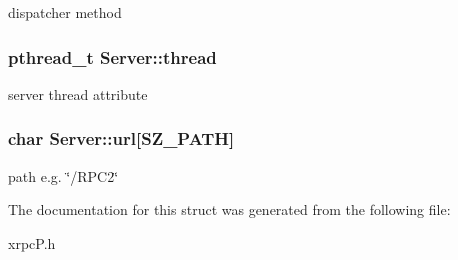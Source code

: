 dispatcher method \hypertarget{structServer_b30292985309c492e4ba0ebbf2a6934a}{
\subsubsection[{thread}]{\setlength{\rightskip}{0pt plus 5cm}pthread\_\-t {\bf Server::thread}}}
\label{structServer_b30292985309c492e4ba0ebbf2a6934a}


server thread attribute \hypertarget{structServer_732b4b0eb4208cc8618eeda41d35effa}{
\subsubsection[{url}]{\setlength{\rightskip}{0pt plus 5cm}char {\bf Server::url}\mbox{[}SZ\_\-PATH\mbox{]}}}
\label{structServer_732b4b0eb4208cc8618eeda41d35effa}


path e.g. \char`\"{}/RPC2\char`\"{} 

The documentation for this struct was generated from the following file:\begin{CompactItemize}
\item 
xrpcP.h\end{CompactItemize}
